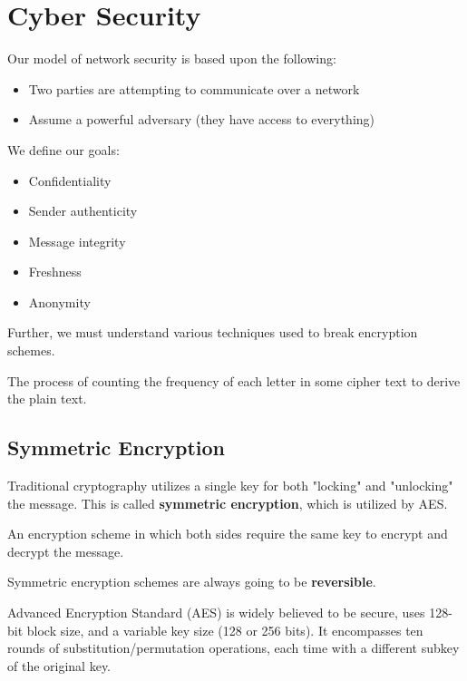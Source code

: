 \chapter{Cyber Security}
Our model of network security is based upon the following:
\begin{itemize}
	\item Two parties are attempting to communicate over a network
	\item Assume a powerful adversary (they have access to everything)
\end{itemize}

We define our goals:
\begin{itemize}
	\item Confidentiality
	\item Sender authenticity
	\item Message integrity
	\item Freshness
	\item Anonymity
\end{itemize}

Further, we must understand various techniques used to break encryption schemes.

\begin{definition}
	The process of counting the frequency of each letter in some cipher text to derive the plain text.
\end{definition}

\section{Symmetric Encryption}
Traditional cryptography utilizes a single key for both "locking" and "unlocking" the message. This is called \textbf{symmetric encryption}, which is utilized by AES.

\begin{definition}
	An encryption scheme in which both sides require the same key to encrypt and decrypt the message.
\end{definition}
\begin{remark}
	Symmetric encryption schemes are always going to be \textbf{reversible}.
\end{remark}

\begin{definition}
	Advanced Encryption Standard (AES) is widely believed to be secure, uses 128-bit block size, and a variable key size (128 or 256 bits). It encompasses ten rounds of substitution/permutation operations, each time with a different subkey of the original key.
\end{definition}

